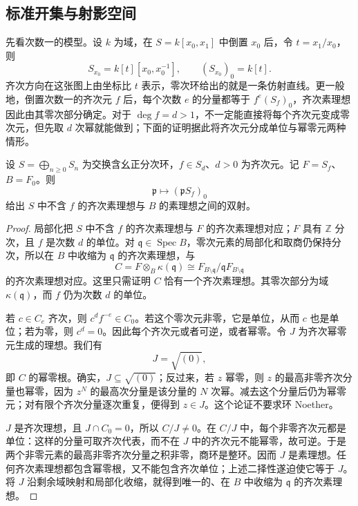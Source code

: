 \subsection{标准开集与射影空间}
\label{b3:subsec:2403:02}

先看次数一的模型。设 \(k\) 为域，在 \(S=k[x_0,x_1]\) 中倒置 \(x_0\) 后，令 \(t=x_1/x_0\)，则
\[
	S_{x_0}=k[t][x_0,x_0^{-1}],\qquad (S_{x_0})_0=k[t].
\]
齐次方向在这张图上由坐标比 \(t\) 表示，零次环给出的就是一条仿射直线。更一般地，倒置次数一的齐次元 \(f\) 后，每个次数 \(e\) 的分量都等于 \(f^e(S_f)_0\)，齐次素理想因此由其零次部分确定。对于 \(\deg f=d>1\)，不一定能直接将每个齐次元变成零次元，但先取 \(d\) 次幂就能做到；下面的证明据此将齐次元分成单位与幂零元两种情形。

\begin{lemma}[齐次素理想的零次对应]\label{b3:lem:proj-homogeneous-prime-correspondence}
	设 \(S=\bigoplus_{n\ge0}S_n\) 为交换含幺正分次环，\(f\in S_d\)、\(d>0\) 为齐次元。记 \(F=S_f\)、\(B=F_0\)。则
	\[
		\mathfrak p\longmapsto(\mathfrak pS_f)_0
	\]
	给出 \(S\) 中不含 \(f\) 的齐次素理想与 \(B\) 的素理想之间的双射。
\end{lemma}
\begin{proof}
	局部化把 \(S\) 中不含 \(f\) 的齐次素理想与 \(F\) 的齐次素理想对应；\(F\) 具有 \(\mathbb Z\) 分次，且 \(f\) 是次数 \(d\) 的单位。对 \(\mathfrak q\in\operatorname{Spec}B\)，零次元素的局部化和取商仍保持分次，所以在 \(B\) 中收缩为 \(\mathfrak q\) 的齐次素理想，与
	\[
		C=F\otimes_B\kappa(\mathfrak q)\cong F_{B\setminus\mathfrak q}/\mathfrak qF_{B\setminus\mathfrak q}
	\]
	的齐次素理想对应。这里只需证明 \(C\) 恰有一个齐次素理想。其零次部分为域 \(\kappa(\mathfrak q)\)，而 \(f\) 仍为次数 \(d\) 的单位。

	若 \(c\in C_e\) 齐次，则 \(c^df^{-e}\in C_0\)。若这个零次元非零，它是单位，从而 \(c\) 也是单位；若为零，则 \(c^d=0\)。因此每个齐次元或者可逆，或者幂零。令 \(J\) 为齐次幂零元生成的理想。我们有
	\[
		J=\sqrt{(0)},
	\]
	即 \(C\) 的幂零根。确实，\(J\subseteq\sqrt{(0)}\)；反过来，若 \(z\) 幂零，则 \(z\) 的最高非零齐次分量也幂零，因为 \(z^N\) 的最高次分量是该分量的 \(N\) 次幂。减去这个分量后仍为幂零元；对有限个齐次分量逐次重复，便得到 \(z\in J\)。这个论证不要求环 Noether。

	\(J\) 是齐次理想，且 \(J\cap C_0=0\)，所以 \(C/J\ne0\)。在 \(C/J\) 中，每个非零齐次元都是单位：这样的分量可取齐次代表，而不在 \(J\) 中的齐次元不能幂零，故可逆。于是两个非零元素的最高非零齐次分量之积非零，商环是整环。因而 \(J\) 是素理想。任何齐次素理想都包含幂零根，又不能包含齐次单位；上述二择性遂迫使它等于 \(J\)。将 \(J\) 沿剩余域映射和局部化收缩，就得到唯一的、在 \(B\) 中收缩为 \(\mathfrak q\) 的齐次素理想。
\end{proof}

